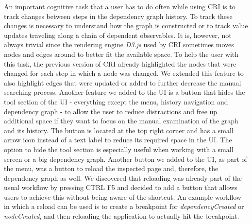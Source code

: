 An important cognitive task that a user has to do often while using CRI is to track changes between steps in the dependency graph history. To track these changes is necessary to understand how the graph is constructed or to track value updates traveling along a chain of dependent observables. It is, however, not always trivial since the rendering engine \emph{D3.js} \cite{D3JS} used by CRI sometimes moves nodes and edges around to better fit the available space. To help the user with this task, the previous version of CRI already highlighted the nodes that were changed for each step in which a node was changed. We extended this feature to also highlight edges that were updated or added to further decrease the manual searching process. Another feature we added to the UI is a button that hides the tool section of the UI - everything except the menu, history navigation and dependency graph - to allow the user to reduce distractions and free up additional space if they want to focus on the manual examination of the graph and its history. The button is located at the top right corner and has a small arrow icon instead of a text label to reduce its required space in the UI. The option to hide the tool section is especially useful when working with a small screen or a big dependency graph. Another button we added to the UI, as part of the menu, was a button to reload the inspected page and, therefore, the dependency graph as well. We discovered that reloading was already part of the usual workflow by pressing CTRL F5 and decided to add a button that allows users to achieve this without being aware of the shortcut. An example workflow in which a reload can be used is to create a breakpoint for \emph{dependencyCreated} or \emph{nodeCreated}, and then reloading the application to actually hit the breakpoint.
